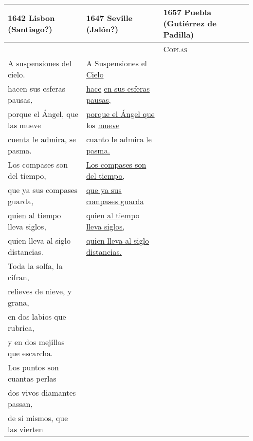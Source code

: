 \begin{tabular}{lll}
    \toprule
    1642 Lisbon (Santiago?) & 
    1647 Seville (Jalón?) & 
    1657 Puebla (Gutiérrez de Padilla) \\
    \midrule 
 
    &
    &
    \textsc{Coplas} \\


    \strophe{} A suspensiones del cielo. &
    \strophe{} \uline{A Suspensiones} \uline{el Cielo} & 
    \\

    hacen sus esferas pausas, &
    \uline{hace} \uline{en sus esferas pausas,} &
    \\

    porque el Ángel, que las mueve &
    \uline{porque el Ángel que} los \uline{mueve} &
    \\

    cuenta le admira, se pasma. &
    \uline{cuanto le admira} le \uline{pasma.} &
    \\

    \strophe{} Los compases son del tiempo, &
    \strophe{} \uline{Los compases son del tiempo,} &
    \\

    que ya sus compases guarda, &
    \uline{que ya sus compases guarda} &
    \\

    quien al tiempo lleva siglos, &
    \uline{quien al tiempo lleva siglos,} &
    \\

    quien lleva al siglo distancias. &
    \uline{quien lleva al siglo distancias.} &
    \\

    \strophe{} Toda la solfa, la cifran, &
    & \\

    relieves de nieve, y grana, &
    & \\

    en dos labios que rubrica, &
    & \\

    y en dos mejillas que escarcha. &
    & \\

    \strophe{} Los puntos son cuantas perlas &
    & \\

    dos vivos diamantes passan, &
    & \\

    de si mismos, que las vierten &
    & \\


\end{tabular}
